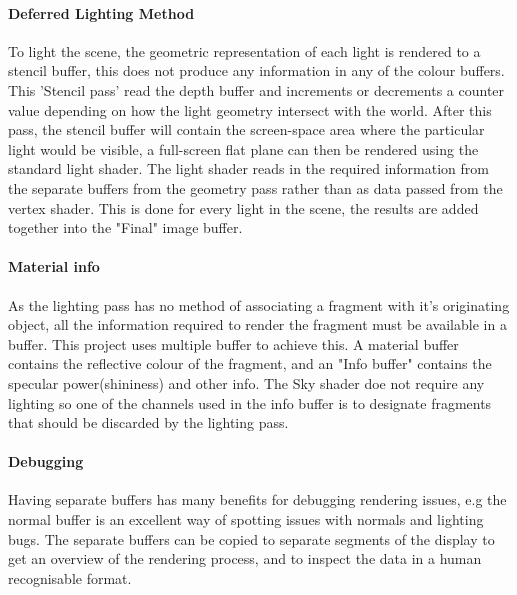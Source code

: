\documentclass[conference]{acmsiggraph}
\begin{document}
\paragraph{Deferred Lighting Method}
To light the scene, the geometric representation of each light is rendered to a stencil buffer, this does not produce any information in any of the colour buffers. This 'Stencil pass' read the depth buffer and increments or decrements a counter value depending on how the light geometry intersect with the world. After this pass, the stencil buffer will contain the screen-space area where the particular light would be visible, a full-screen flat plane can then be rendered using the standard light shader. The light shader reads in the required information from the separate buffers from the geometry pass rather than as data passed from the vertex shader. This is done for every light in the scene, the results are added together into the "Final" image buffer.

\paragraph{Material info}
As the lighting pass has no method of associating a fragment with it's originating object, all the information required to render the fragment must be available in a buffer. This project uses multiple buffer to achieve this. A material buffer contains the reflective colour of the fragment, and an "Info buffer" contains the specular power(shininess) and other info. The Sky shader doe not require any lighting so one of the channels used in the info buffer is to designate fragments that should be discarded by the lighting pass.

\paragraph{Debugging}
Having separate buffers has many benefits for debugging rendering issues, e.g the normal buffer is  an excellent way of spotting issues with normals and lighting bugs. The separate buffers can be copied to separate segments of the display to get an overview of the rendering process, and to inspect the data in a human recognisable format.
\end{document}
